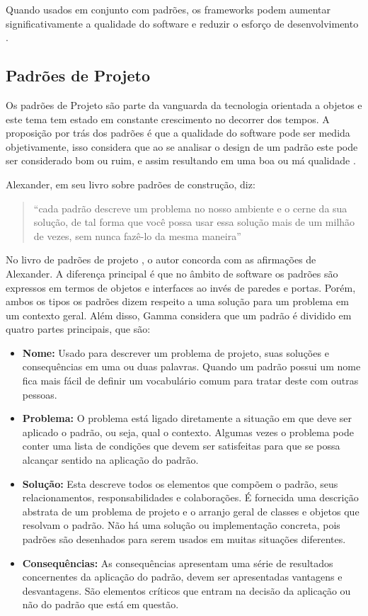 Quando usados em conjunto com padrões, os frameworks podem aumentar significativamente a qualidade do software e reduzir o esforço de desenvolvimento \cite{Fayad:Schimidt:1997}.

\subsection{Padrões de Projeto}

Os padrões de Projeto são parte da vanguarda da tecnologia orientada a objetos e este tema tem estado em constante crescimento no decorrer dos tempos. A proposição por trás dos padrões é que a qualidade do software pode ser medida objetivamente, isso considera que ao se analisar o design de um padrão este pode ser considerado bom ou ruim, e assim resultando em uma boa ou má qualidade \cite{Shalloway:Trott:2004}.

Alexander, em seu livro \cite{Alexander:1979} sobre padrões de construção, diz:

\begin{quote}
	``cada padrão descreve um problema no nosso
ambiente e o cerne da sua solução, de tal forma que você possa usar essa solução mais
de um milhão de vezes, sem nunca fazê-lo da mesma maneira''
\end{quote}

No livro de padrões de projeto \cite{Gamma:Helm:Johnson:Vlissides:1995}, o autor concorda com as afirmações de Alexander. A diferença principal é que no âmbito de software os padrões são expressos em termos de objetos e interfaces ao invés de paredes e portas. Porém, ambos os tipos os padrões dizem respeito a uma solução para um problema em um contexto geral. Além disso, Gamma considera que um padrão é dividido em quatro partes principais, que são:

\begin{itemize}
	\item \textbf{Nome:} Usado para descrever um problema de projeto, suas soluções e consequências em uma ou duas palavras. Quando um padrão possui um nome fica mais fácil de definir um vocabulário comum para tratar deste com outras pessoas.
	\item \textbf{Problema:} O problema está ligado diretamente a situação em que deve ser aplicado o padrão, ou seja, qual o contexto. Algumas vezes o problema pode conter uma lista de condições que devem ser satisfeitas para que se possa alcançar sentido na aplicação do padrão.
	\item \textbf{Solução:} Esta descreve todos os elementos que compõem o padrão, seus relacionamentos, responsabilidades e colaborações. É fornecida uma descrição abstrata de um problema de projeto e o arranjo geral de classes e objetos que resolvam o padrão. Não há uma solução ou implementação concreta, pois padrões são desenhados para serem usados em muitas situações diferentes.
	\item \textbf{Consequências:} As consequências apresentam uma série de resultados concernentes da aplicação do padrão, devem ser apresentadas vantagens e desvantagens. São elementos críticos que entram na decisão da aplicação ou não do padrão que está em questão.
\end{itemize}

